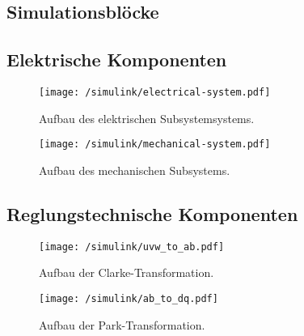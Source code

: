 
\cleardoublepage




\listoffigures
\cleardoublepage
\nocite{*}
\printbibliography
\begin{appendix}
\chapter{Simulationsblöcke}
\section{Elektrische Komponenten}
\begin{figure}[htb]
	\centering
	\texttt{[image: /simulink/electrical-system.pdf]}
	\label{fig:electrical-system}
	\caption{Aufbau des elektrischen Subsystemsystems.}
\end{figure}

\begin{figure}[htb]
\centering
\texttt{[image: /simulink/mechanical-system.pdf]}
\label{fig:mechanical-system}
\caption{Aufbau des mechanischen Subsystems.}
\end{figure}
\newpage
\section{Reglungstechnische Komponenten}
\begin{figure}[h]
	\centering
	\texttt{[image: /simulink/uvw\_to\_ab.pdf]}
	\label{fig:uvw_to_ab}
	\caption{Aufbau der Clarke-Transformation.}
\end{figure}

\begin{figure}[h]
	\centering
	\texttt{[image: /simulink/ab\_to\_dq.pdf]}
	\label{fig:uvw_to_ab}
	\caption{Aufbau der Park-Transformation.}
\end{figure}

	
	
\end{appendix}

